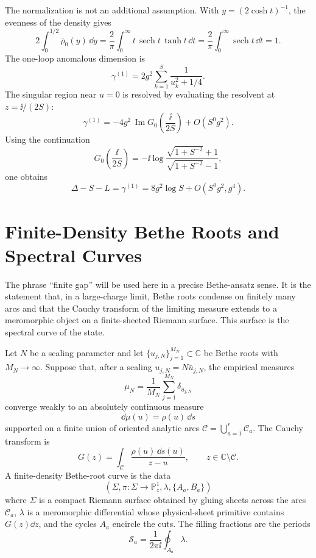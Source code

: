 The normalization is not an additional assumption.  With
\(y=(2\cosh t)^{-1}\), the evenness of the density gives
\[
  2\int_0^{1/2}\bar\rho_0(y)\,\dd y
  =
  \frac{2}{\pi}\int_0^\infty t\,\operatorname{sech}t\,\tanh t\,\dd t
  =
  \frac{2}{\pi}\int_0^\infty \operatorname{sech}t\,\dd t
  =
  1.
\]
The one-loop anomalous dimension is
\[
  \gamma^{(1)}
  =
  2g^2\sum_{k=1}^S\frac{1}{u_k^2+1/4}.
\]
The singular region near \(u=0\) is resolved by evaluating the resolvent at
\(z=\ii/(2S)\):
\[
  \gamma^{(1)}
  =
  -4g^2\,\operatorname{Im}G_0\!\left(\frac{\ii}{2S}\right)+O(S^0g^2).
\]
Using the continuation
\[
  G_0\!\left(\frac{\ii}{2S}\right)
  =
  -\ii
  \log
  \frac{\sqrt{1+S^{-2}}+1}{\sqrt{1+S^{-2}}-1},
\]
one obtains
\begin{equation}
  \Delta-S-L
  =
  \gamma^{(1)}
  =
  8g^2\log S+O(S^0g^2,g^4).
  \label{eq:planar-n4-sl2-one-loop-cusp-log}
\end{equation}

\section{Finite-Density Bethe Roots and Spectral Curves}
\label{sec:planar-n4-finite-density-spectral-curves}

The phrase ``finite gap'' will be used here in a precise Bethe-ansatz sense.
It is the statement that, in a large-charge limit, Bethe roots condense on
finitely many arcs and that the Cauchy transform of the limiting measure
extends to a meromorphic object on a finite-sheeted Riemann surface.  This
surface is the spectral curve of the state.

\begin{definition}
\label{def:finite-density-bethe-root-curve}
Let \(N\) be a scaling parameter and let
\(\{u_{j,N}\}_{j=1}^{M_N}\subset\mathbb C\) be Bethe roots with
\(M_N\to\infty\).  Suppose that, after a scaling
\(u_{j,N}=N\bar u_{j,N}\), the empirical measures
\[
  \mu_N=\frac1{M_N}\sum_{j=1}^{M_N}\delta_{\bar u_{j,N}}
\]
converge weakly to an absolutely continuous measure
\[
  \dd\mu(u)=\rho(u)\,\dd s
\]
supported on a finite union of oriented analytic arcs
\(\mathcal C=\bigcup_{a=1}^r\mathcal C_a\).  The Cauchy transform is
\[
  G(z)=\int_{\mathcal C}\frac{\rho(u)\,\dd s(u)}{z-u},
  \qquad z\in\mathbb C\setminus\mathcal C .
\]
A finite-density Bethe-root curve is the data
\[
  \left(\Sigma,\pi:\Sigma\to\mathbb P^1_z,\lambda,\{A_a,B_a\}\right)
\]
where \(\Sigma\) is a compact Riemann surface obtained by gluing sheets across
the arcs \(\mathcal C_a\), \(\lambda\) is a meromorphic differential whose
physical-sheet primitive contains \(G(z)\dd z\), and the cycles \(A_a\)
encircle the cuts.  The filling fractions are the periods
\[
  \mathcal S_a=\frac{1}{2\pi\ii}\oint_{A_a}\lambda .
\]
\end{definition}

